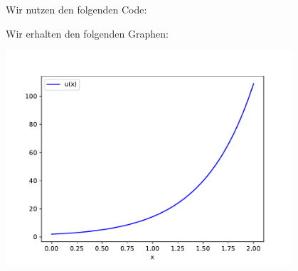 \section{}

Wir nutzen den folgenden Code:



Wir erhalten den folgenden Graphen:

\begin{center}
  \includegraphics[width = 0.8\textwidth]{chapter_04/exercise_04_21_figure.pdf}
\end{center}
